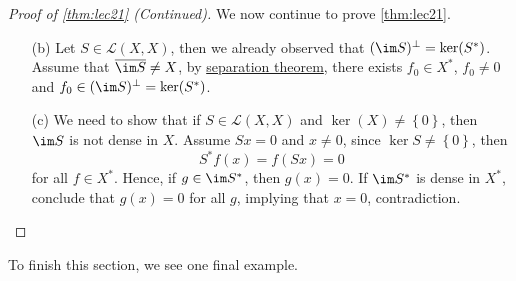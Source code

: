 \begin{proof}[Proof of \autoref{thm:lec21} (Continued)]
	We now continue to prove \autoref{thm:lec21}.
	\begin{enumerate}
		\item[(b)] Let \(S\in \mathcal{L} (X, X)\), then we already observed that \((\im S)^{\perp} = \ker(S^{\ast} )\). Assume that \(\overline{\im S} \neq X\), by \hyperref[thm:separation-of-convex-sets]{separation theorem}, there exists \(f_0\in X^{\ast} \), \(f_0 \neq 0\) and \(f_0 \in (\im S)^{\perp} = \ker(S^{\ast} )\).
		\item[(c)] We need to show that if \(S\in \mathcal{L} (X, X)\) and \(\ker(X) \neq \left\{ 0 \right\} \), then \(\im S\) is not dense in \(X\). Assume \(Sx = 0\) and \(x \neq 0\), since \(\ker S \neq \left\{ 0 \right\} \), then
			\[
				S^{\ast} f(x) = f(Sx) = 0
			\]
			for all \(f\in X^{\ast} \). Hence, if \(g\in \im S^{\ast} \), then \(g(x) = 0\). If \(\im S^{\ast} \) is dense in \(X^{\ast} \), conclude that \(g(x) = 0\) for all \(g\), implying that \(x = 0\), contradiction.
	\end{enumerate}
\end{proof}

To finish this section, we see one final example.

